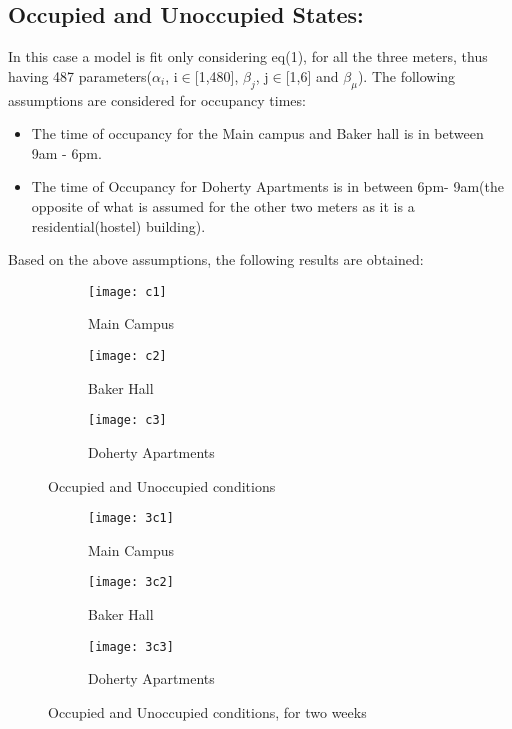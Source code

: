 \documentclass[a4paper,11pt]{article}
\begin{document}
\begin{itemize}
\subsection{Occupied and Unoccupied States:}
In this case a model is fit only considering eq(1), for all the three meters, thus having 487 parameters($\alpha_i$, i$\in$[1,480],  $\beta_j$, j$\in$[1,6] and $\beta_{\mu}$).
The following assumptions are considered for occupancy times:
\begin{itemize}
\itemsep0em
\item The time of occupancy for the Main campus and Baker hall is in between 9am - 6pm.
\item The time of Occupancy for Doherty Apartments is in between 6pm- 9am(the opposite of what is assumed for the other two meters as it is a residential(hostel) building). 
\end{itemize}
Based on the above assumptions, the following results are obtained:
\begin{figure}[H]
        \centering
        \begin{subfigure}[b]{0.3\textwidth}
                \texttt{[image: c1]}
                \caption{Main Campus}
                \label{fig:Load 1}
        \end{subfigure}%
\hfill
        \begin{subfigure}[b]{0.3\textwidth}
                \texttt{[image: c2]}
                \caption{Baker Hall}
                \label{fig:tiger}
        \end{subfigure}
 \hfill       
        \begin{subfigure}[b]{0.35\textwidth}
                \texttt{[image: c3]}
                \caption{Doherty Apartments}
                \label{fig:tiger}
        \end{subfigure}
        \caption{Occupied and Unoccupied conditions}\label{fig:animals}
\end{figure}


\begin{figure}[H]
        \centering
        \begin{subfigure}[b]{0.3\textwidth}
                \texttt{[image: 3c1]}
                \caption{Main Campus}
                \label{fig:Load 1}
        \end{subfigure}%
\hfill
        \begin{subfigure}[b]{0.3\textwidth}
                \texttt{[image: 3c2]}
                \caption{Baker Hall}
                \label{fig:tiger}
        \end{subfigure}
 \hfill       
        \begin{subfigure}[b]{0.35\textwidth}
                \texttt{[image: 3c3]}
                \caption{Doherty Apartments}
                \label{fig:tiger}
        \end{subfigure}
        \caption{Occupied and Unoccupied conditions, for two weeks}\label{fig:animals}
\end{figure}

\end{itemize}
\end{document}
